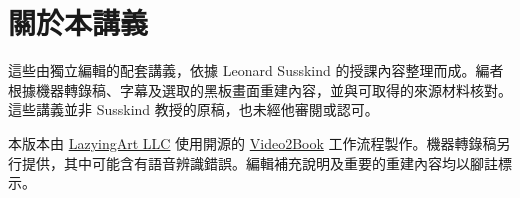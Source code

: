 \documentclass[11pt,oneside]{book}
\begin{document}
\frontmatter
\hypersetup{pageanchor=false}

\hypersetup{pageanchor=true}

\clearpage
\chapter*{關於本講義}
這些由獨立編輯的配套講義，依據 Leonard Susskind 的授課內容整理而成。編者根據機器轉錄稿、字幕及選取的黑板畫面重建內容，並與可取得的來源材料核對。這些講義並非 Susskind 教授的原稿，也未經他審閱或認可。

本版本由 \href{https://lazying.art}{LazyingArt LLC} 使用開源的 \href{https://github.com/lachlanchen/Video2Book}{Video2Book} 工作流程製作。機器轉錄稿另行提供，其中可能含有語音辨識錯誤。編輯補充說明及重要的重建內容均以腳註標示。
\clearpage
\tableofcontents
\mainmatter










\end{document}
